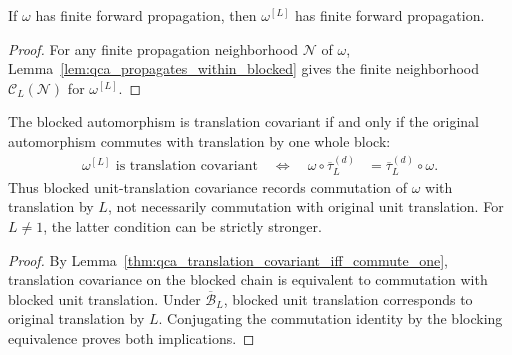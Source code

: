 \begin{lemma}
    \label{lem:qca_finite_propagation_blocked}
    \leanok
    If $\omega$ has finite forward propagation, then $\omega^{[L]}$ has finite
    forward propagation.
\end{lemma}

\begin{proof}\leanok
    For any finite propagation neighborhood $\mathcal N$ of $\omega$,
    Lemma~\ref{lem:qca_propagates_within_blocked} gives the finite neighborhood
    $\mathcal C_L(\mathcal N)$ for $\omega^{[L]}$.
\end{proof}

\begin{lemma}
    \label{thm:qca_blocked_translation_covariant_iff}
    \leanok
    The blocked automorphism is translation covariant if and only if the
    original automorphism commutes with translation by one whole block:
    \begin{align}
        \omega^{[L]}\text{ is translation covariant}
        \quad\Longleftrightarrow\quad
        \omega\circ\overline\tau^{(d)}_L
         & =\overline\tau^{(d)}_L\circ\omega.
    \end{align}
    Thus blocked unit-translation covariance records commutation of $\omega$
    with translation by $L$, not necessarily commutation with original unit
    translation.  For $L\neq1$, the latter condition can be strictly stronger.
\end{lemma}

\begin{proof}\leanok
    By Lemma~\ref{thm:qca_translation_covariant_iff_commute_one}, translation
    covariance on the blocked chain is equivalent to commutation with blocked
    unit translation.  Under $\overline{\mathcal B}_L$, blocked unit translation
    corresponds to original translation by $L$.  Conjugating the commutation
    identity by the blocking equivalence proves both implications.
\end{proof}

